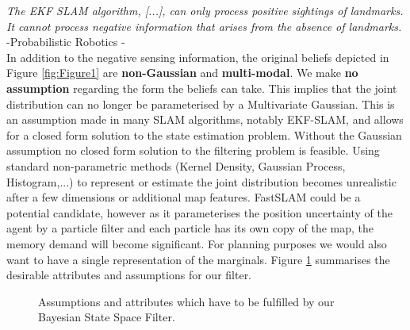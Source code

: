 {\quote \textit{The EKF SLAM algorithm, [...], can only process positive sightings of landmarks. It cannot process negative information
that arises from the absence of landmarks. } -Probabilistic Robotics \cite[p.313]{Thrun_Burgard_Fox_2005}-}\\[0.01cm]

In addition to the negative sensing information, the original beliefs depicted in Figure \ref{fig:Figure1} are \textbf{non-Gaussian}
and \textbf{multi-modal}. We make \textbf{no assumption} regarding the form the beliefs can take. This implies that the joint distribution 
can no longer be parameterised by a Multivariate Gaussian. 
This is an assumption made in many SLAM algorithms, notably EKF-SLAM, and allows for a closed form solution to the state estimation problem. Without the Gaussian assumption 
no closed form solution to the filtering problem is feasible. 
Using standard non-parametric methods (Kernel Density, Gaussian Process, Histogram,...) to represent or estimate the joint distribution becomes
unrealistic after a few dimensions or additional map features. 
FastSLAM could be a potential candidate, however as it parameterises the position uncertainty of the agent by a particle filter and each
particle has its own copy of the map, the memory demand will become significant.  For planning purposes we would also want to have a 
single representation of the marginals. Figure \ref{fig:ch5_assmuptions} summarises the desirable attributes and assumptions for our filter.

\begin{figure}
\centering
{}%
\caption{Assumptions and attributes which have to be fulfilled by our Bayesian State Space Filter. }
 \label{fig:ch5_assmuptions}
\end{figure}

